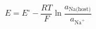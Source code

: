 \documentclass[preview]{standalone}
\begin{document}
\[E = E^\circ - \frac{RT}{F}\ln \frac{a_\text{Na(host)}}{a_{\text{Na}^+}}\]
\end{document}
